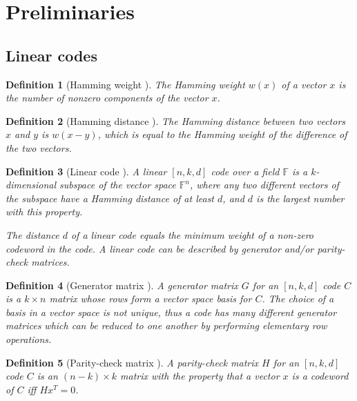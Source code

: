 \documentclass{report}
\newtheorem{definition}{Definition}{\bfseries}{\itshape}
\begin{document}
\section{Preliminaries}

\subsection{Linear codes}
\begin{definition}[Hamming weight \cite{SloaneBook}]
The Hamming weight $w(x)$ of a vector $x$ is the number of nonzero components of the vector $x$.
\end{definition}

\begin{definition}[Hamming distance \cite{SloaneBook}]
The Hamming distance between two vectors $x$ and $y$ is $w(x - y)$, which is equal to the Hamming weight of the difference of the two vectors.
\end{definition}

\begin{definition}[Linear code \cite{SloaneBook}]
A linear $[n, k, d]$ code over a field $\mathbb{F}$ is a $k$-dimensional subspace of the vector space $\mathbb{F}^n$, where any two different vectors of the subspace have a Hamming distance of at least $d$, and $d$ is the largest number with this property.

The distance $d$ of a linear code equals the minimum weight of a non-zero codeword in the code. A linear code can be described by generator and/or parity-check matrices.
\end{definition}

\begin{definition}[Generator matrix \cite{SloaneBook}]
A generator matrix $G$ for an $[n, k, d]$ code $C$ is a $k \times n$ matrix whose rows form a vector space basis for $C$. The choice of a basis in a vector space is not unique, thus a code has many different generator matrices which can be reduced to one another by performing elementary row operations.
\end{definition}

\begin{definition}[Parity-check matrix \cite{SloaneBook}]
A parity-check matrix $H$ for an $[n, k, d]$ code $C$ is an $(n-k) \times k$ matrix with the property that a vector $x$ is a codeword of $C$ iff $Hx^T = 0$.
\end{definition}
\end{document}
